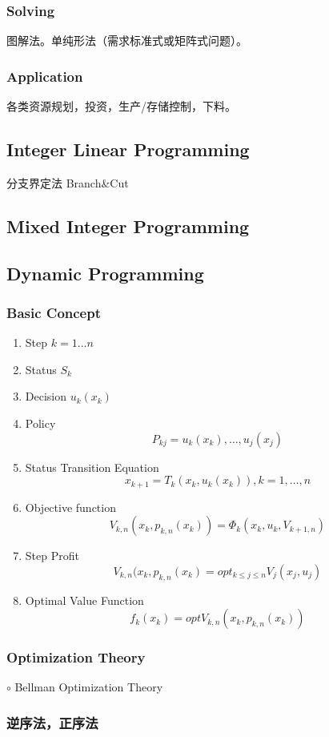\documentclass[12pt,a4paper]{article} \usepackage{kurier}
\begin{document}
\begin{CJK}{UTF8}{gkai}
\begin{multicols}{2}
		\subsubsection{Solving}
			图解法。单纯形法（需求标准式或矩阵式问题）。
		\subsubsection{Application}
			各类资源规划，投资，生产/存储控制，下料。
	\subsection{Integer Linear Programming}
		分支界定法 Branch\&Cut
	\subsection{Mixed Integer Programming}
	\subsection{Dynamic Programming}
		\subsubsection{Basic Concept}
			\begin{enumerate}
			\item Step $k = 1 \ldots n$
			\item Status $S_k$
			\item Decision $u_k(x_k)$
			\item Policy \[ P_{kj} = { u_k(x_k), \ldots, u_j(x_j) } \]
			\item Status Transition Equation \[ x_{k+1} = T_k (x_k, u_k (x_k) ) , k = 1, \ldots, n \]
			\item Objective function \[ V_{k,n} (x_k, p_{k,n}(x_k) ) = \Phi_k (x_k, u_k, V_{k+1,n}) \]
			\item Step Profit \[ V_{k,n}(x_k, p_{k,n}(x_k) = opt_{k\leq j \leq n} V_j(x_j,u_j) \]
			\item Optimal Value Function \[ f_k(x_k) = opt V_{k,n} (x_k, p_{k,n}(x_k)) \]
			\end{enumerate}
		\subsubsection{Optimization Theory}
			$\circ$ Bellman Optimization Theory
		\subsubsection{逆序法，正序法}

\end{multicols}
\end{CJK}
\end{document}
